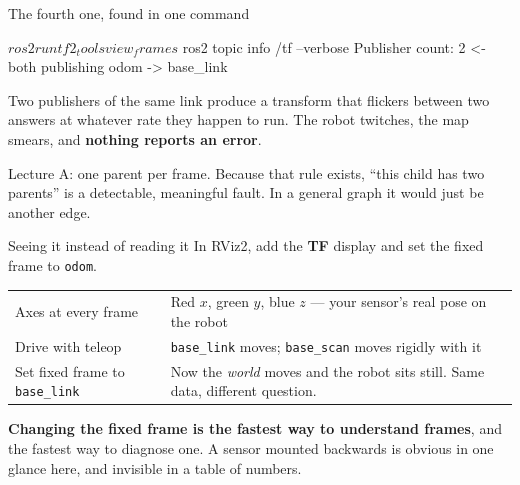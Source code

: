 \documentclass[aspectratio=169]{beamer}
\begin{document}
\begin{frame}[fragile]{The fourth one, found in one command}
  \begin{shells}
$ ros2 run tf2_tools view_frames
$ ros2 topic info /tf --verbose
Publisher count: 2        <- both publishing odom -> base_link
  \end{shells}

  \vspace{0.5em}
  \small
  Two publishers of the same link produce a transform that flickers between two answers at
  whatever rate they happen to run. The robot twitches, the map smears, and \textbf{nothing
  reports an error}.

  \vspace{0.5em}
  \begin{underhood}
    \footnotesize
    Lecture A: one parent per frame. Because that rule exists, ``this child has two parents''
    is a detectable, meaningful fault. In a general graph it would just be another edge.
  \end{underhood}
\end{frame}

\begin{frame}{Seeing it instead of reading it}
  \small
  In RViz2, add the \textbf{TF} display and set the fixed frame to \texttt{odom}.

  \vspace{0.6em}
  \begin{center}
  \begin{tabular}{@{}p{3.6cm}p{7.1cm}@{}}
    \toprule
    Axes at every frame & Red $x$, green $y$, blue $z$ --- your sensor's real pose on the robot \\[0.3em]
    Drive with teleop & \texttt{base\_link} moves; \texttt{base\_scan} moves rigidly with it \\[0.3em]
    Set fixed frame to \texttt{base\_link} & Now the \emph{world} moves and the robot sits still. Same data, different question. \\
    \bottomrule
  \end{tabular}
  \end{center}

  \vspace{0.6em}
  \begin{inthefield}
    \footnotesize
    \textbf{Changing the fixed frame is the fastest way to understand frames}, and the fastest
    way to diagnose one. A sensor mounted backwards is obvious in one glance here, and invisible
    in a table of numbers.
  \end{inthefield}
\end{frame}
\end{document}
